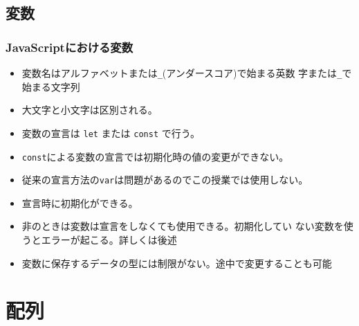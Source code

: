 \subsection{変数}
\begin{frame}[containsverbatim]
 \frametitle{JavaScriptにおける変数}
\begin{itemize}
 \item 変数名はアルファベットまたは\Verb+_+(アンダースコア)で始まる英数
       字または\Verb+_+で始まる文字列
 \item 大文字と小文字は区別される。
 \item 変数の宣言は \texttt{let} または \texttt{const} で行う。
 \item \texttt{const}による変数の宣言では初期化時の値の変更ができない。
 \item 従来の宣言方法の\texttt{var}は問題があるのでこの授業では使用しない。
 \item 宣言時に初期化ができる。
 \item 非\Strict のときは変数は宣言をしなくても使用できる。初期化してい
       ない変数を使うとエラーが起こる。詳しくは後述
 \item 変数に保存するデータの型には制限がない。途中で変更することも可能
\end{itemize}
\end{frame}
\section{配列}
